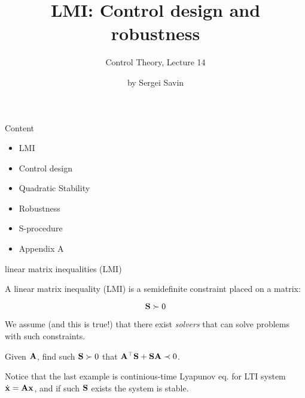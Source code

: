 \documentclass{beamer}
\title{LMI: Control design and robustness}
\subtitle{Control Theory, Lecture 14}
\author{by Sergei Savin}
\date{\mydate}
\begin{document}
	\maketitle
	
	
	
	\begin{frame}{Content}
		\begin{itemize}
			\item LMI
			\item Control design
			\item Quadratic Stability
			\item Robustness
			\item S-procedure
			\item Appendix A
		\end{itemize}
	\end{frame}
	
	
	
	
	\begin{frame}{linear matrix inequalities (LMI)}
		\begin{flushleft}
			
			A linear matrix inequality (LMI) is a semidefinite constraint placed on a matrix:
			
			\begin{equation}
				\mathbf{S} \succ 0
			\end{equation}
			
			We assume (and this is true!) that there exist \emph{solvers} that can solve problems with such constraints. 
			
			
			\begin{example}
				Given $\mathbf{A}$, find such $\mathbf{S}\succ 0$ that $\mathbf{A}^\top\mathbf{S} + \mathbf{S}\mathbf{A} \prec 0$.
			\end{example}
			
			Notice that the last example is continious-time Lyapunov eq. for LTI system $\dot{\mathbf{x}} = \mathbf{A}\mathbf{x}$, and if such $\mathbf{S}$ exists the system is stable. 
			
		\end{flushleft}
	\end{frame}
	
	
	
\end{document}
